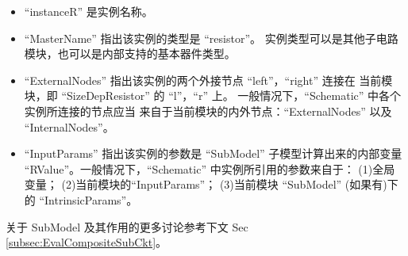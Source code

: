 \begin{itemize}[partopsep=0pt,topsep=0pt,itemsep=0pt,parsep=0pt]
  \item “instanceR” 是实例名称。
  \item “MasterName” 指出该实例的类型是 “resistor”。
    实例类型可以是其他子电路模块，也可以是内部支持的基本器件类型。
  \item “ExternalNodes” 指出该实例的两个外接节点 “left”，“right” 连接在
    当前模块，即 “SizeDepResistor” 的 “l”，“r” 上。
    一般情况下，“Schematic” 中各个实例所连接的节点应当
    来自于当前模块的内外节点：“ExternalNodes” 以及 “InternalNodes”。
  \item “InputParams” 指出该实例的参数是 “SubModel” 子模型计算出来的内部变量
    “RValue”。一般情况下，“Schematic” 中实例所引用的参数来自于：
    (1)全局变量；
    (2)当前模块的“InputParams”；
    (3)当前模块 “SubModel” (如果有)下的 “IntrinsicParams”。
\end{itemize}
关于 SubModel 及其作用的更多讨论参考下文 Sec \ref{subsec:EvalCompositeSubCkt}。

